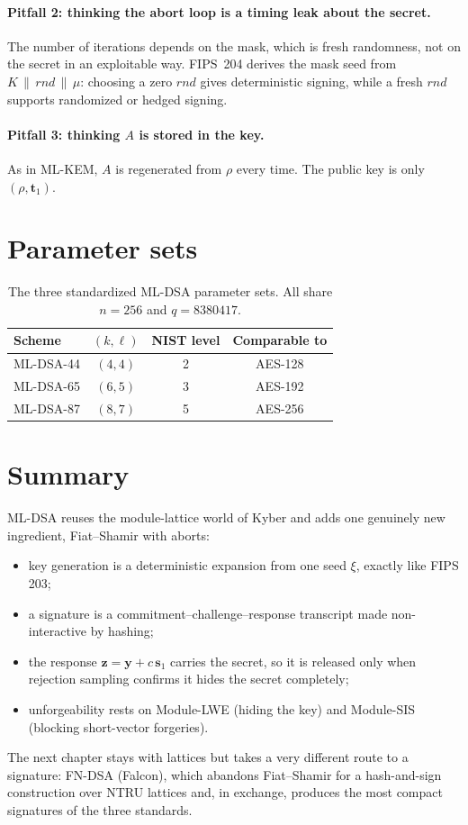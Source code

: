 \paragraph{Pitfall 2: thinking the abort loop is a timing leak about the secret.}
The number of iterations depends on the mask, which is fresh randomness, not on the secret in an exploitable way. FIPS~204 derives the mask seed from $K\,\|\,rnd\,\|\,\mu$: choosing a zero $rnd$ gives deterministic signing, while a fresh $rnd$ supports randomized or hedged signing.

\paragraph{Pitfall 3: thinking $A$ is stored in the key.}
As in ML-KEM, $A$ is regenerated from $\rho$ every time. The public key is only $(\rho,\mathbf{t}_1)$.

\section{Parameter sets}

\begin{table}[H]
\centering
\begin{tabular}{lccc}
\toprule
Scheme & $(k,\ell)$ & NIST level & Comparable to \\
\midrule
ML-DSA-44 & $(4,4)$ & 2 & AES-128 \\
ML-DSA-65 & $(6,5)$ & 3 & AES-192 \\
ML-DSA-87 & $(8,7)$ & 5 & AES-256 \\
\bottomrule
\end{tabular}
\caption{The three standardized ML-DSA parameter sets. All share $n=256$ and $q=8380417$.}
\end{table}

\section{Summary}

ML-DSA reuses the module-lattice world of Kyber and adds one genuinely new ingredient, Fiat--Shamir with aborts:

\begin{itemize}
  \item key generation is a deterministic expansion from one seed $\xi$, exactly like FIPS 203;
  \item a signature is a commitment--challenge--response transcript made non-interactive by hashing;
  \item the response $\mathbf{z}=\mathbf{y}+c\,\mathbf{s}_1$ carries the secret, so it is released only when rejection sampling confirms it hides the secret completely;
  \item unforgeability rests on Module-LWE (hiding the key) and Module-SIS (blocking short-vector forgeries).
\end{itemize}

The next chapter stays with lattices but takes a very different route to a signature: FN-DSA (Falcon), which abandons Fiat--Shamir for a hash-and-sign construction over NTRU lattices and, in exchange, produces the most compact signatures of the three standards.

\printbibliography[heading=chapterrefs]
